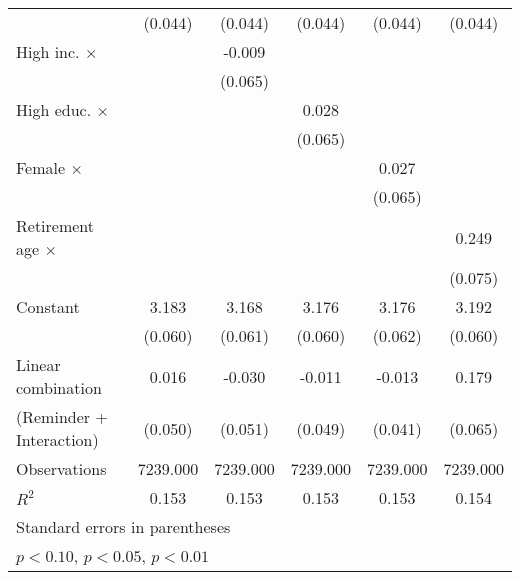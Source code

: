 {\begin{tabular}{l*{5}{c}}
                    &     (0.044)         &     (0.044)         &     (0.044)         &     (0.044)         &     (0.044)         \\
\addlinespace
High inc. $\times$  &                     &      -0.009         &                     &                     &                     \\
                    &                     &     (0.065)         &                     &                     &                     \\
\addlinespace
High educ. $\times$ &                     &                     &       0.028         &                     &                     \\
                    &                     &                     &     (0.065)         &                     &                     \\
\addlinespace
Female $\times$     &                     &                     &                     &       0.027         &                     \\
                    &                     &                     &                     &     (0.065)         &                     \\
\addlinespace
Retirement age $\times$&                     &                     &                     &                     &       0.249\sym{***}\\
                    &                     &                     &                     &                     &     (0.075)         \\
\addlinespace
Constant            &       3.183\sym{***}&       3.168\sym{***}&       3.176\sym{***}&       3.176\sym{***}&       3.192\sym{***}\\
                    &     (0.060)         &     (0.061)         &     (0.060)         &     (0.062)         &     (0.060)         \\
\midrule
Linear combination  &       0.016         &      -0.030         &      -0.011         &      -0.013         &       0.179         \\
(Reminder + Interaction)&     (0.050)         &     (0.051)         &     (0.049)         &     (0.041)         &     (0.065)         \\
Observations        &    7239.000         &    7239.000         &    7239.000         &    7239.000         &    7239.000         \\
\(R^{2}\)           &       0.153         &       0.153         &       0.153         &       0.153         &       0.154         \\
\bottomrule
\multicolumn{6}{l}{\footnotesize Standard errors in parentheses}\\
\multicolumn{6}{l}{\footnotesize \sym{*} \(p<0.10\), \sym{**} \(p<0.05\), \sym{***} \(p<0.01\)}\\
\end{tabular}
}
